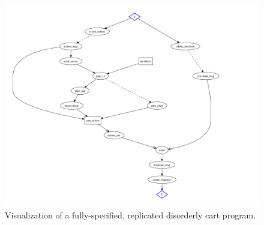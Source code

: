 \begin{figure}[t]
\centering
\includegraphics[width=1.2\linewidth]{fig/disorderly_complete.pdf}
\vspace{-10pt}
\caption{Visualization of a fully-specified, replicated disorderly cart program.}
\label{fig:pdg-disorderly-analysis}
\vspace{-2pt}
\end{figure}


